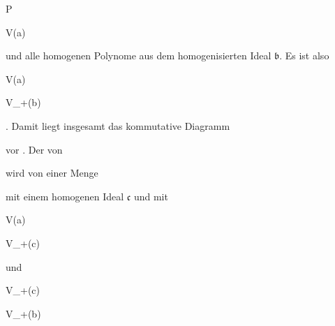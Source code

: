 {{\vergleichskette

{ P
}

{ \in }{ V({\mathfrak a})
}

{  }{
}

{    }{
}

{   }{
}

}
{}{}{}
und alle homogenen Polynome aus dem homogenisierten Ideal ${\mathfrak b}$. Es ist also


\mavergleichskette

{\vergleichskette

{ V({\mathfrak a})
}

{ \subseteq }{ V_+({\mathfrak b})
}

{  }{
}

{    }{
}

{   }{
}

}
{}{}{.}
Damit liegt insgesamt das kommutative Diagramm


 {  }


vor
 {} {.}
Der
 von

 wird von einer Menge

 mit einem homogenen Ideal ${\mathfrak c}$ und mit


\mavergleichskette

{\vergleichskette

{ V({\mathfrak a})
}

{ \subseteq }{ V_+({\mathfrak c})
}

{  }{
}

{    }{
}

{   }{
}

}
{}{}{}
und


\mavergleichskette

{\vergleichskette

{ V_+({\mathfrak c})
}

{ \subseteq }{ V_+({\mathfrak b})
}

}}
